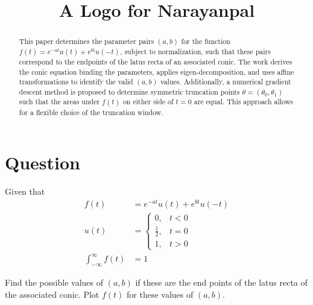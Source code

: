 \documentclass[conference]{IEEEtran}
\theoremstyle{remark}
\begin{document}
	
	\title{A Logo for Narayanpal}
	\author{
		}
	\maketitle
	
\begin{abstract}
	This paper determines the parameter pairs $(a, b)$ for the function $f(t) = e^{-at}u(t) + e^{bt}u(-t)$, subject to normalization, such that these pairs correspond to the endpoints of the latus recta of an associated conic. The work derives the conic equation binding the parameters, applies eigen-decomposition, and uses affine transformations to identify the valid $(a, b)$ values. Additionally, a numerical gradient descent method is proposed to determine symmetric truncation points $\theta = (\theta_0, \theta_1)$ such that the areas under $f(t)$ on either side of $t=0$ are equal. This approach allows for a flexible choice of the truncation window.
\end{abstract}



	\section{Question}
	Given that
	\begin{align}
		f(t) &= e^{-at}u(t) + e^{bt}u(-t) \label{q1}\\
		u(t) &= \begin{cases}
			0, & t<0\\
			\frac{1}{2}, & t=0 \\
			1, & t>0
		\end{cases} \label{q2}\\
		\int_{-\infty}^{\infty} f(t) &= 1 \label{q3}
	\end{align}
	
	Find the possible values of $(a,b)$ if these are the end points of the latus recta of the associated conic. Plot $f(t)$ for these values of $(a,b)$.
	
\end{document}
